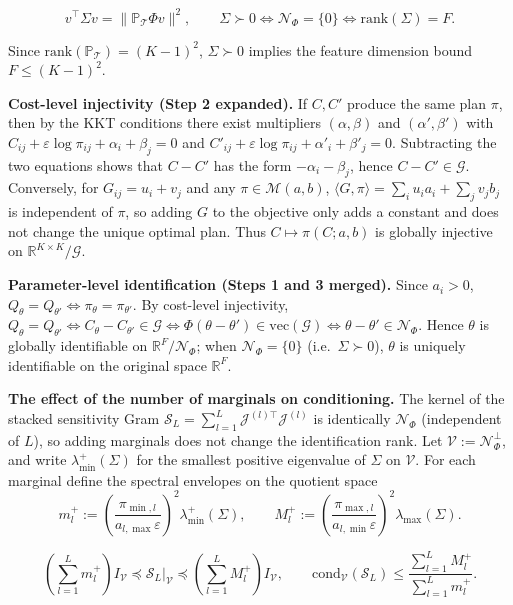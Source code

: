 \documentclass[11pt,a4paper]{article}
\theoremstyle{remark}
\begin{document}
\[
v^{\top}\Sigma v=\|\mathbb{P}_{\mathcal{T}}\Phi v\|^2,
\qquad
\Sigma\succ0\iff\mathcal{N}_\Phi=\{0\}\iff\mathrm{rank}(\Sigma)=F.
\]

Since $\mathrm{rank}(\mathbb{P}_{\mathcal{T}})=(K-1)^2$, $\Sigma\succ0$ implies the feature
dimension bound $F\le(K-1)^2$.

\textbf{Cost-level injectivity (Step 2 expanded).} If $C,C'$ produce the same plan $\pi$,
then by the KKT conditions there exist multipliers $(\alpha,\beta)$ and $(\alpha',\beta')$
with $C_{ij}+\varepsilon\log\pi_{ij}+\alpha_i+\beta_j=0$ and
$C'_{ij}+\varepsilon\log\pi_{ij}+\alpha'_i+\beta'_j=0$. Subtracting the two equations shows
that $C-C'$ has the form $-\alpha_i-\beta_j$, hence $C-C'\in\mathcal{G}$. Conversely, for
$G_{ij}=u_i+v_j$ and any $\pi\in\mathcal{M}(a,b)$,
$\langle G,\pi\rangle=\sum_i u_i a_i+\sum_j v_j b_j$ is independent of $\pi$, so adding $G$
to the objective only adds a constant and does not change the unique optimal plan. Thus
$C\mapsto\pi(C;a,b)$ is globally injective on $\mathbb{R}^{K\times K}/\mathcal{G}$.

\textbf{Parameter-level identification (Steps 1 and 3 merged).} Since $a_i>0$,
$Q_\theta=Q_{\theta'}\iff\pi_\theta=\pi_{\theta'}$. By cost-level injectivity,
$Q_\theta=Q_{\theta'}\iff C_\theta-C_{\theta'}\in\mathcal{G}\iff\Phi(\theta-\theta')\in\mathrm{vec}(\mathcal{G})\iff\theta-\theta'\in\mathcal{N}_\Phi$.
Hence $\theta$ is globally identifiable on $\mathbb{R}^F/\mathcal{N}_\Phi$; when
$\mathcal{N}_\Phi=\{0\}$ (i.e.\ $\Sigma\succ0$), $\theta$ is uniquely identifiable on the
original space $\mathbb{R}^F$.

\textbf{The effect of the number of marginals on conditioning.} The kernel of the stacked
sensitivity Gram $\mathcal{S}_L=\sum_{l=1}^L\mathcal{J}^{(l)\top}\mathcal{J}^{(l)}$ is
identically $\mathcal{N}_\Phi$ (independent of $L$), so adding marginals does not change
the identification rank. Let $\mathcal V:=\mathcal{N}_\Phi^\perp$, and write
$\lambda_{\min}^{+}(\Sigma)$ for the smallest positive eigenvalue of $\Sigma$ on
$\mathcal V$. For each marginal define the spectral envelopes on the quotient space
\[
m_l^{+}:=\left(\frac{\pi_{\min,l}}{a_{l,\max}\varepsilon}\right)^2\lambda_{\min}^{+}(\Sigma),\qquad
M_l^{+}:=\left(\frac{\pi_{\max,l}}{a_{l,\min}\varepsilon}\right)^2\lambda_{\max}(\Sigma).
\]

\[
\left(\sum_{l=1}^L m_l^{+}\right)I_{\mathcal V}
\preceq\mathcal{S}_L\big|_{\mathcal V}
\preceq\left(\sum_{l=1}^L M_l^{+}\right)I_{\mathcal V},
\qquad
\mathrm{cond}_{\mathcal V}(\mathcal{S}_L)
\le\frac{\sum_{l=1}^L M_l^{+}}{\sum_{l=1}^L m_l^{+}}.
\]
\end{document}
